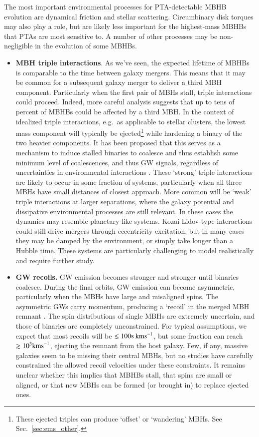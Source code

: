 \documentclass[onecolumn,authoryear]{els-mrw}
\begin{document}
The most important environmental processes for PTA-detectable MBHB evolution are dynamical friction and stellar scattering.  Circumbinary disk torques may also play a role, but are likely less important for the highest-mass MBHBs that PTAs are most sensitive to.  A number of other processes may be non-negligible in the evolution of some MBHBs.
\begin{itemize}
    \item \textbf{MBH triple interactions}.  As we've seen, the expected lifetime of MBHBs is comparable to the time between galaxy mergers.  This means that it may be common for a subsequent galaxy merger to deliver a third MBH component.  Particularly when the first pair of MBHs stall, triple interactions could proceed.  Indeed, more careful analysis suggests that up to tens of percent of MBHBs could be affected by a third MBH.  In the context of idealized triple interactions, e.g.~as applicable to stellar clusters, the lowest mass component will typically be ejected\footnote{These ejected triples can produce `offset' or `wandering' MBHs.  See Sec.~\ref{sec:ems_other}.} while hardening a binary of the two heavier components.  It has been proposed that this serves as a mechanism to induce stalled binaries to coalesce and thus establish some minimum level of coalescences, and thus GW signals, regardless of uncertainties in environmental interactions \citep{Ryu+2018, Bonetti+2018}.  These `strong' triple interactions are likely to occur in some fraction of systems, particularly when all three MBHs have small distances of closest approach.  More common will be `weak' triple interactions at larger separations, where the galaxy potential and dissipative environmental processes are still relevant.  In these cases the dynamics may resemble planetary-like systems.  Kozai-Lidov type interactions could still drive mergers through eccentricity excitation, but in many cases they may be damped by the environment, or simply take longer than a Hubble time.  These systems are particularly challenging to model realistically and require further study.
    \item \textbf{GW recoils.}  GW emission becomes stronger and stronger until binaries coalesce.  During the final orbits, GW emission can become asymmetric, particularly when the MBHs have large and misaligned spins.  The asymmetric GWs carry momentum, producing a `recoil' in the merged MBH remnant \citep{Blecha+2016}.  The spin distributions of single MBHs are extremely uncertain, and those of binaries are completely unconstrained.  For typical assumptions, we expect that most recoils will be $\lesssim 100\textrm{s}~\rm{km s}^{-1}$, but some fraction can reach $\gtrsim 10^3 \rm{km s}^{-1}$, ejecting the remnant from the host galaxy.  Few, if any, massive galaxies seem to be missing their central MBHs, but no studies have carefully constrained the allowed recoil velocities under these constraints.  It remains unclear whether this implies that MBHBs stall, that spins are small or aligned, or that new MBHs can be formed (or brought in) to replace ejected ones.

\end{itemize}
\end{document}
